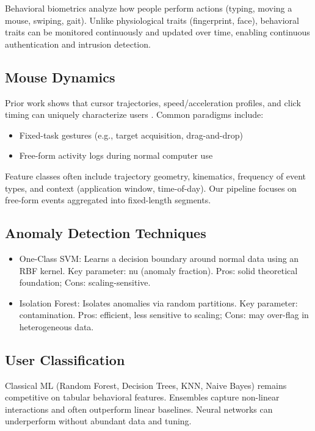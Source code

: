 \documentclass[
  12pt,
]{article}
\providecommand{\tightlist}{%
  \setlength{\itemsep}{0pt}\setlength{\parskip}{0pt}}
\begin{document}
Behavioral biometrics analyze how people perform actions (typing, moving
a mouse, swiping, gait). Unlike physiological traits (fingerprint,
face), behavioral traits can be monitored continuously and updated over
time, enabling continuous authentication and intrusion detection.

\subsection{Mouse Dynamics}\label{mouse-dynamics}

Prior work shows that cursor trajectories, speed/acceleration profiles,
and click timing can uniquely characterize users \cite{rahman2021}.
Common paradigms include:

\begin{itemize}
\tightlist
\item
  Fixed-task gestures (e.g., target acquisition, drag-and-drop)
\item
  Free-form activity logs during normal computer use
\end{itemize}

Feature classes often include trajectory geometry, kinematics, frequency
of event types, and context (application window, time-of-day). Our
pipeline focuses on free-form events aggregated into fixed-length
segments.

\subsection{Anomaly Detection
Techniques}\label{anomaly-detection-techniques}

\begin{itemize}
\tightlist
\item
  One-Class SVM: Learns a decision boundary around normal data using an
  RBF kernel. Key parameter: nu (anomaly fraction). Pros: solid
  theoretical foundation; Cons: scaling-sensitive.
\item
  Isolation Forest: Isolates anomalies via random partitions. Key
  parameter: contamination. Pros: efficient, less sensitive to scaling;
  Cons: may over-flag in heterogeneous data.
\end{itemize}

\subsection{User Classification}\label{user-classification}

Classical ML (Random Forest, Decision Trees, KNN, Naive Bayes) remains
competitive on tabular behavioral features. Ensembles capture non-linear
interactions and often outperform linear baselines. Neural networks can
underperform without abundant data and tuning.
\end{document}

